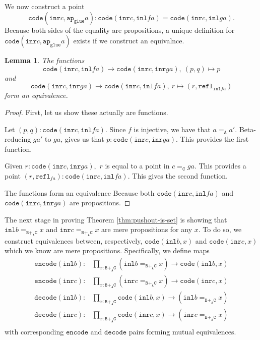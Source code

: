 \message{ !name(notes.tex)}\documentclass[12pt]{amsart}
\newcommand{\from}{\colon}
\newcommand{\type}[1]{\mathtt{#1}}
\newcommand{\tin}{\colon}
\newcommand{\A}{\type{A}}
\newcommand{\B}{\type{B}}
\newcommand{\C}{\type{C}}
\newcommand{\BAC}{\B +_{\A} \C}
\newcommand{\ap}{\type{ap}}
\newcommand{\inl}{\type{inl}}
\newcommand{\inr}{\type{inr}}
\newcommand{\glue}{\type{glue}}
\newcommand{\refl}{\type{refl}}
\newcommand{\code}{\type{code}}
\newcommand{\encode}{\type{encode}}
\newcommand{\decode}{\type{decode}}
\newtheorem{lemma}{Lemma}
\theoremstyle{remark}
\theoremstyle{definition}
\begin{document}
We now construct a point
\[
  \code ( \inr c , \ap_{\glue} a ) \tin
  \code ( \inr c , \inl fa ) =
  \code ( \inr c , \inl ga ).
\]
Because both sides of the equality are propositions, a unique
definition for \( \code ( \inr c , \ap_{\glue} a ) \) exists if we
construct an equivalnce.

\begin{lemma} \label{thm:code-cfa-isEquiv-code-cga}
%
  The functions
  \[
    \code ( \inr c , \inl fa ) \to \code ( \inr c , \inr ga ), \:
    ( p,q ) \mapsto p
  \]
  and
  \[
    \code ( \inr c , \inr ga ) \to \code ( \inr c , \inl fa ), \:
    r \mapsto ( r , \refl_{\inl fa} )
  \]
  form an equivalence. 
%
\end{lemma}
\begin{proof}
%
  First, let us show these actually are functions.
  
  Let
  \(
      ( p,q ) \tin \code ( \inr c , \inl fa ).
  \)
  Since \( f \) is injective, we have that
  \(
      a =_\A a' .
  \)
  Beta-reducing \( ga' \) to \( ga \), gives us that
  \(
      p \tin \code ( \inr c , \inr ga ).
  \)
  This provides the first
  function.

  Given
  \(
      r \tin \code ( \inr c , \inr ga ),
  \)
  \( r \) is equal to a
  point in
  \(
      c =_\C ga.
  \)
  This provides a point
  \(
      ( r , \refl_{fa} ) \tin \code ( \inr c , \inl fa ).
  \)
  This gives the second function.

  The functions form an equivalence Because both
  \( \code ( \inr c , \inl fa ) \) and
  \( \code ( \inr c , \inr ga ) \) are propositions.
\end{proof}


The next stage in proving Theorem \ref{thm:pushout-is-set} is showing
that
%
\(
    \inl b =_{\BAC} x 
\)
% 
and
%
\(
\inr c =_{\BAC} x
\)
% 
are mere propositions for any \( x \).  To do so, we construct
equivalences between, respectively,
%
\(
    \code ( \inl b , x )
\)
% 
and
%
\(
    \code ( \inr c , x )
\)
% 
which we know are mere propositions. Specifically, we define maps
%
\begin{align*}
  \encode ( \inl b ) \from & \prod\limits_{x \tin \BAC}
    ( \inl b =_{\BAC} x ) \to \code ( \inl b , x ) \\
  \encode ( \inr c ) \from & \prod\limits_{x \tin \BAC}
    ( \inr c =_{\BAC} x ) \to \code ( \inr c , x ) \\
  \decode ( \inl b ) \from & \prod\limits_{x \tin \BAC}
    \code ( \inl b , x ) \to ( \inl b =_{\BAC} x ) \\
  \decode ( \inr c ) \from & \prod\limits_{x \tin \BAC}
    \code ( \inr c , x ) \to ( \inr c =_{\BAC} x ) \\
\end{align*}
%
with corresponding \( \encode \) and \( \decode \) pairs forming
mutual equivalences.
\end{document}

